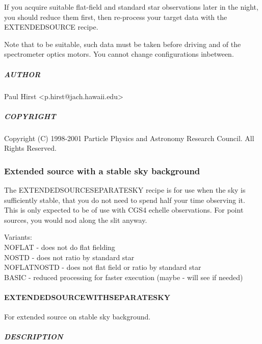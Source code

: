 \documentclass[twoside,11pt]{article}
\renewcommand{\_}{\texttt{\symbol{95}}}
\begin{document}
If you acquire suitable flat-field and standard star observations later
in the night, you should reduce them first, then re-process your
target data with the EXTENDED\_SOURCE recipe.



Note that to be suitable, such data must be taken before driving and
of the spectrometer optics motors. You cannot change configurations
inbetween.

\subparagraph*{AUTHOR\label{EXTENDED_SOURCE_NOFLAT_NOSTD_AUTHOR}}

Paul Hirst <p.hirst@jach.hawaii.edu>

\subparagraph*{COPYRIGHT\label{EXTENDED_SOURCE_NOFLAT_NOSTD_COPYRIGHT}}

Copyright (C) 1998-2001 Particle Physics and Astronomy Research
Council. All Rights Reserved.


\subsubsection{Extended source with a stable sky background}

The EXTENDED\_SOURCE\_SEPARATE\_SKY recipe is for use when the sky is
sufficiently stable, that you do not need to spend half your time
observing it. This is only expected to be of use with CGS4 echelle
observations. For point sources, you would nod along the slit anyway.

Variants: \\
\_NOFLAT - does not do flat fielding \\
\_NOSTD - does not ratio by standard star \\
\_NOFLAT\_NOSTD - does not flat field or ratio by standard star \\
\_BASIC - reduced processing for faster execution (maybe - will see if needed) \\

\paragraph*{EXTENDED\_SOURCE\_WITH\_SEPARATE\_SKY\label{EXTENDED_SOURCE_WITH_SEPARATE_SKY}}

For extended source on stable sky background.

\subparagraph*{DESCRIPTION\label{EXTENDED_SOURCE_WITH_SEPARATE_SKY_DESCRIPTION}}
\end{document}
